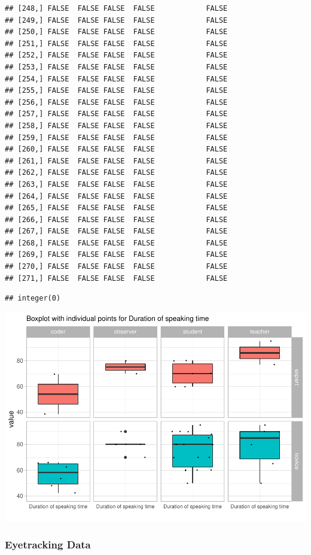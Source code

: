 \documentclass[
  english,
  man,floatsintext]{apa6}
\begin{document}
\begin{verbatim}
## [248,] FALSE  FALSE FALSE  FALSE            FALSE
## [249,] FALSE  FALSE FALSE  FALSE            FALSE
## [250,] FALSE  FALSE FALSE  FALSE            FALSE
## [251,] FALSE  FALSE FALSE  FALSE            FALSE
## [252,] FALSE  FALSE FALSE  FALSE            FALSE
## [253,] FALSE  FALSE FALSE  FALSE            FALSE
## [254,] FALSE  FALSE FALSE  FALSE            FALSE
## [255,] FALSE  FALSE FALSE  FALSE            FALSE
## [256,] FALSE  FALSE FALSE  FALSE            FALSE
## [257,] FALSE  FALSE FALSE  FALSE            FALSE
## [258,] FALSE  FALSE FALSE  FALSE            FALSE
## [259,] FALSE  FALSE FALSE  FALSE            FALSE
## [260,] FALSE  FALSE FALSE  FALSE            FALSE
## [261,] FALSE  FALSE FALSE  FALSE            FALSE
## [262,] FALSE  FALSE FALSE  FALSE            FALSE
## [263,] FALSE  FALSE FALSE  FALSE            FALSE
## [264,] FALSE  FALSE FALSE  FALSE            FALSE
## [265,] FALSE  FALSE FALSE  FALSE            FALSE
## [266,] FALSE  FALSE FALSE  FALSE            FALSE
## [267,] FALSE  FALSE FALSE  FALSE            FALSE
## [268,] FALSE  FALSE FALSE  FALSE            FALSE
## [269,] FALSE  FALSE FALSE  FALSE            FALSE
## [270,] FALSE  FALSE FALSE  FALSE            FALSE
## [271,] FALSE  FALSE FALSE  FALSE            FALSE
\end{verbatim}

\begin{verbatim}
## integer(0)
\end{verbatim}

\includegraphics{paper_1_supplement_files/figure-latex/coded speaking time-1.pdf}

\hypertarget{eyetracking-data-1}{%
\subsubsection{Eyetracking Data}\label{eyetracking-data-1}}
\end{document}
